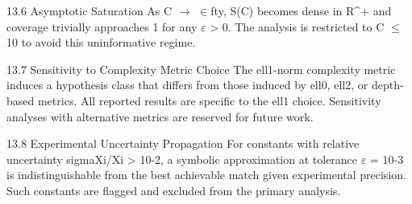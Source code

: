   13.6 Asymptotic Saturation
  As C $\rightarrow$ $\in$fty, S(C) becomes dense in R\textasciicircum{}+ and coverage trivially approaches 1 for any $\varepsilon$
  > 0. The analysis is restricted to C $\leq$ 10 to avoid this uninformative regime.

  13.7 Sensitivity to Complexity Metric Choice
  The ell1-norm complexity metric induces a hypothesis class that differs from those
  induced by ell0, ell2, or depth-based metrics. All reported results are specific to the ell1
  choice. Sensitivity analyses with alternative metrics are reserved for future work.

  13.8 Experimental Uncertainty Propagation
  For constants with relative uncertainty sigmaXi/Xi > 10-2, a symbolic approximation at
  tolerance $\varepsilon$ = 10-3 is indistinguishable from the best achievable match given
  experimental precision. Such constants are flagged and excluded from the primary
  analysis.

